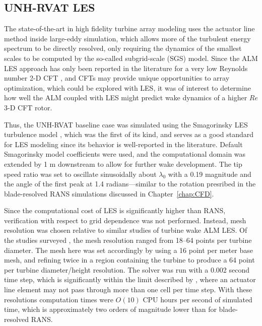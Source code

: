 \subsection{UNH-RVAT LES}

The state-of-the-art in high fidelity turbine array modeling uses the actuator
line method inside large-eddy simulation, which allows more of the turbulent
energy spectrum to be directly resolved, only requiring the dynamics of the
smallest scales to be computed by the so-called subgrid-scale (SGS) model. Since
the ALM LES approach has only been reported in the literature for a very low
Reynolds number 2-D CFT \cite{Shamsoddin2014}, and CFTs may provide unique
opportunities to array optimization, which could be explored with LES, it was of
interest to determine how well the ALM coupled with LES might predict wake
dynamics of a higher $Re$ 3-D CFT rotor.

Thus, the UNH-RVAT baseline case was simulated using the Smagorinsky LES
turbulence model \cite{Smagorinsky1963}, which was the first of its kind, and
serves as a good standard for LES modeling since its behavior is well-reported
in the literature. Default Smagorinsky model coefficients were used, and the
computational domain was extended by 1 m downstream to allow for further wake
development. The tip speed ratio was set to oscillate sinusoidally about
$\lambda_0$ with a 0.19 magnitude and the angle of the first peak at 1.4
radians---similar to the rotation presribed in the blade-resolved RANS
simulations discussed in Chapter~\ref{chap:CFD}.

Since the computational cost of LES is significantly higher than RANS,
verification with respect to grid dependence was not performed. Instead, mesh
resolution was chosen relative to similar studies of turbine wake ALM LES. Of
the studies surveyed
\cite{Shamsoddin2014,Archer2013,Martinez-Tossas2015a,Troldborg2007}, the mesh
resolution ranged from 18--64 points per turbine diameter. The mesh here was set
accordingly by using a 16 point per meter base mesh, and refining twice in a
region containing the turbine to produce a 64 point per turbine diameter/height
resolution. The solver was run with a 0.002 second time step, which is
significantly within the limit described by \cite{Martinez-Tossas2015}, where an
actuator line element may not pass through more than one cell per time step.
With these resolutions computation times were $O(10)$ CPU hours per second of
simulated time, which is approximately two orders of magnitude lower than for
blade-resolved RANS.

